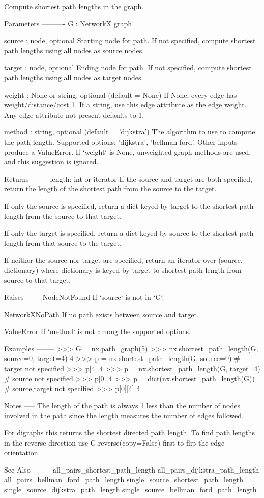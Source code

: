 \begin{DoxyVerb}Compute shortest path lengths in the graph.

Parameters
----------
G : NetworkX graph

source : node, optional
    Starting node for path.
    If not specified, compute shortest path lengths using all nodes as
    source nodes.

target : node, optional
    Ending node for path.
    If not specified, compute shortest path lengths using all nodes as
    target nodes.

weight : None or string, optional (default = None)
    If None, every edge has weight/distance/cost 1.
    If a string, use this edge attribute as the edge weight.
    Any edge attribute not present defaults to 1.

method : string, optional (default = 'dijkstra')
    The algorithm to use to compute the path length.
    Supported options: 'dijkstra', 'bellman-ford'.
    Other inputs produce a ValueError.
    If `weight` is None, unweighted graph methods are used, and this
    suggestion is ignored.

Returns
-------
length: int or iterator
    If the source and target are both specified, return the length of
    the shortest path from the source to the target.

    If only the source is specified, return a dict keyed by target
    to the shortest path length from the source to that target.

    If only the target is specified, return a dict keyed by source
    to the shortest path length from that source to the target.

    If neither the source nor target are specified, return an iterator
    over (source, dictionary) where dictionary is keyed by target to
    shortest path length from source to that target.

Raises
------
NodeNotFound
    If `source` is not in `G`.

NetworkXNoPath
    If no path exists between source and target.

ValueError
    If `method` is not among the supported options.

Examples
--------
>>> G = nx.path_graph(5)
>>> nx.shortest_path_length(G, source=0, target=4)
4
>>> p = nx.shortest_path_length(G, source=0)  # target not specified
>>> p[4]
4
>>> p = nx.shortest_path_length(G, target=4)  # source not specified
>>> p[0]
4
>>> p = dict(nx.shortest_path_length(G))  # source,target not specified
>>> p[0][4]
4

Notes
-----
The length of the path is always 1 less than the number of nodes involved
in the path since the length measures the number of edges followed.

For digraphs this returns the shortest directed path length. To find path
lengths in the reverse direction use G.reverse(copy=False) first to flip
the edge orientation.

See Also
--------
all_pairs_shortest_path_length
all_pairs_dijkstra_path_length
all_pairs_bellman_ford_path_length
single_source_shortest_path_length
single_source_dijkstra_path_length
single_source_bellman_ford_path_length
\end{DoxyVerb}
 